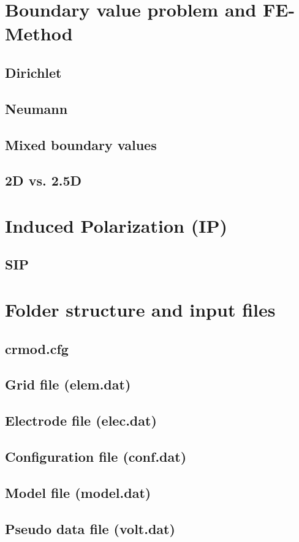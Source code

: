 \section{Boundary value problem and FE-Method}\label{sect:crmod_boundary_fe}
\subsection{Dirichlet}\label{sub:crmod_dirichlet}
\subsection{Neumann}\label{sub:crmod_neumann}
\subsection{Mixed boundary values}\label{sub:crmod_mixed}
\subsection{2D vs. 2.5D}\label{sub:crmod_2dvs25d}
\clearpage
\section{Induced Polarization (IP)}\label{sub:crmod_ip}
\subsection{SIP}\label{sub:crmod_sip}
\clearpage
\section{Folder structure and input files}\label{sect:crmod_dir}
\subsection{crmod.cfg}\label{sub:crmod_input}
\subsection{Grid file (elem.dat)}\label{sub:crmod_grid}
\subsection{Electrode file (elec.dat)}\label{sub:crmod_elec}
\subsection{Configuration file (conf.dat)}\label{sub:crmod_conf}
\subsection{Model file (model.dat)}\label{sub:crmod_modl}
\subsection{Pseudo data file (volt.dat)}\label{sub:crmod_volt}
